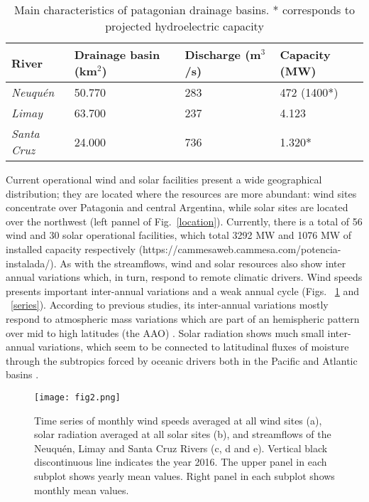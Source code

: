 \documentclass[AMA,Times1COL]{WileyNJDv5} %
\begin{document}
\begin{linenumbers}
\begin{table}[hbpt]
	\caption{Main characteristics of patagonian drainage basins. * corresponds to projected hydroelectric capacity}
	\label{rios}
	\begin{center}
		\begin{tabular}{ m{5em}m{6em}m{6em}m{6em} }
			\hline
			River & Drainage basin (km$^2$) & Discharge (m$^3$/s) & Capacity (MW)	\\
			\hline
			\textit{Neuquén}  &    50.770 & 283 & 472 (1400*)   \\
			\textit{Limay}     &    63.700 & 237 & 4.123   \\
			\textit{Santa Cruz}   &    24.000 & 736 & 1.320*      \\ 
			\hline
		\end{tabular}
	\end{center}
\end{table}

Current operational wind and solar facilities present a wide geographical distribution; they are located where the resources are more abundant: wind sites concentrate over Patagonia and central Argentina, while solar sites are located over the northwest (left pannel of Fig.~\ref{location}). Currently, there is a total of 56 wind and 30 solar operational facilities, which total 3292 MW and 1076 MW of installed capacity respectively (https://cammesaweb.cammesa.com/potencia-instalada/). As with the streamflows, wind and solar resources also show inter annual variations which, in turn, respond to remote climatic drivers. Wind speeds presents important inter-annual variations and a weak annual cycle (Figs. ~\ref{variables} and ~\ref{series}). According to previous studies, its inter-annual variations mostly respond to atmospheric mass variations which are part of an hemispheric pattern over mid to high latitudes (the AAO) \cite{bianchi2017large, bianchi2022assessing}. Solar radiation shows much small inter-annual variations, which seem to be connected to latitudinal fluxes of moisture through the subtropics forced by oceanic drivers both in the Pacific and Atlantic basins \cite{bianchi2022assessing}.

\begin{figure}[hbpt]
	\centering
	\hspace*{0cm}   
	\texttt{[image: fig2.png]}
	\caption{\label{variables} Time series of monthly wind speeds averaged at all wind sites (a), solar radiation averaged at all solar sites (b), and streamflows of the Neuquén, Limay and Santa Cruz Rivers (c, d and e). Vertical black discontinuous line indicates the year 2016. The upper panel in each subplot shows yearly mean values. Right panel in each subplot shows monthly mean values.}
\end{figure}


\end{linenumbers}
\end{document}
